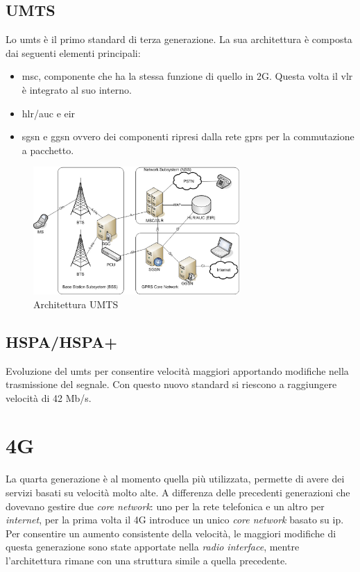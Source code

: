 \subsection{UMTS}
Lo \gls{umts} è il primo standard di terza generazione.
La sua architettura è composta dai seguenti elementi principali:
\begin{itemize}
    \item \gls{msc}, componente che ha la stessa funzione di quello in 2G. Questa volta il \gls{vlr} è integrato al suo interno.
    \item \gls{hlr}/\gls{auc} e \gls{eir}
    \item \gls{sgsn} e \gls{ggsn} ovvero dei componenti ripresi dalla rete \gls{gprs} per la commutazione a pacchetto.
\end{itemize}
\begin{figure}[ht]
    \centering
    \includegraphics[width=0.7\textwidth]{images/3g-umts.png}
    \caption{Architettura UMTS}
\end{figure}


\subsection{HSPA/HSPA+}
Evoluzione del \gls{umts} per consentire velocità maggiori apportando modifiche nella trasmissione del segnale.
Con questo nuovo standard si riescono a raggiungere velocità di 42 Mb/s\cite{hspa}.

\clearpage

\section{4G}
La quarta generazione è al momento quella più utilizzata, permette di avere dei servizi basati su velocità molto alte. 
A differenza delle precedenti generazioni che dovevano gestire due \textit{core network}: uno per la rete telefonica e un altro
per \textit{internet}, per la prima volta il 4G introduce un unico \textit{core network} basato su \gls{ip}.\\
Per consentire un aumento consistente della velocità, le maggiori modifiche di questa generazione sono state apportate nella \textit{radio interface}, mentre
l'architettura rimane con una struttura simile a quella precedente.
